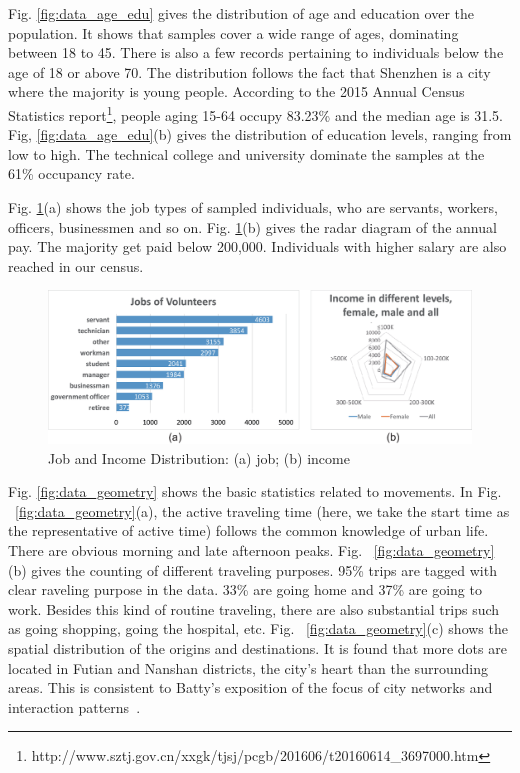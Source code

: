\documentclass{ieeeaccess}
\begin{document}
Fig. \ref{fig:data_age_edu} gives the distribution of age and education over the population. It shows that samples cover a wide range of ages, dominating between 18 to 45. There is also a few records pertaining to individuals below the age of 18 or above 70. The distribution follows the fact that Shenzhen is a city where the majority is young people. According to the 2015 Annual Census Statistics report\footnote{http://www.sztj.gov.cn/xxgk/tjsj/pcgb/201606/t20160614\_3697000.htm}, people aging 15-64 occupy 83.23\% and the median age is 31.5. Fig, \ref{fig:data_age_edu}(b) gives the distribution of education levels, ranging from low to high. The technical college and university dominate the samples at the 61\% occupancy rate.


Fig. \ref{fig:data_job_inc}(a) shows the job types of sampled individuals, who are servants, workers, officers, businessmen and so on. Fig. \ref{fig:data_job_inc}(b) gives the radar diagram of the annual pay. The majority get paid below 200,000. Individuals with higher salary are also reached in our census.

\begin{figure}[htb!]
 \centering %
 \includegraphics[width=\columnwidth]{pictures/data2}
 \caption{Job and Income Distribution: (a) job; (b) income}
 \label{fig:data_job_inc}
\end{figure}


Fig. \ref{fig:data_geometry} shows the basic statistics related to movements. In Fig. ~\ref{fig:data_geometry}(a), the active traveling time (here, we take the start time as the representative of active time) follows the common knowledge of urban life. There are obvious morning and late afternoon peaks. Fig. ~\ref{fig:data_geometry}(b) gives the counting of different traveling purposes. 95\% trips are tagged with clear raveling purpose in the data. 33\% are going home and 37\% are going to work. Besides this kind of routine traveling, there are also substantial trips such as going shopping, going the hospital, etc. Fig. ~\ref{fig:data_geometry}(c) shows the spatial distribution of the origins and destinations. It is found that more dots are located in Futian and Nanshan districts, the city's heart than the surrounding areas. This is consistent to Batty's exposition of the focus of city networks and interaction patterns~\cite{batty2013new}.
\end{document}
